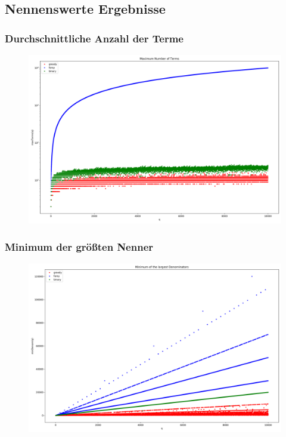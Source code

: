 \documentclass{beamer}
\begin{document}
\subsection[Ergebnisse]{Nennenswerte Ergebnisse}
\begin{frame}
	\frametitle{Durchschnittliche Anzahl der Terme}
	\begin{figure}[h]
		\includegraphics[width=\textwidth]{../LaTeX-Doc/images/maxTerms.png}
	\end{figure}
\end{frame}

\begin{frame}
\frametitle{Minimum der größten Nenner}
\begin{figure}[h]
	\includegraphics[width=\textwidth]{../LaTeX-Doc/images/minDenom.png}
\end{figure}
\end{frame}
\end{document}
